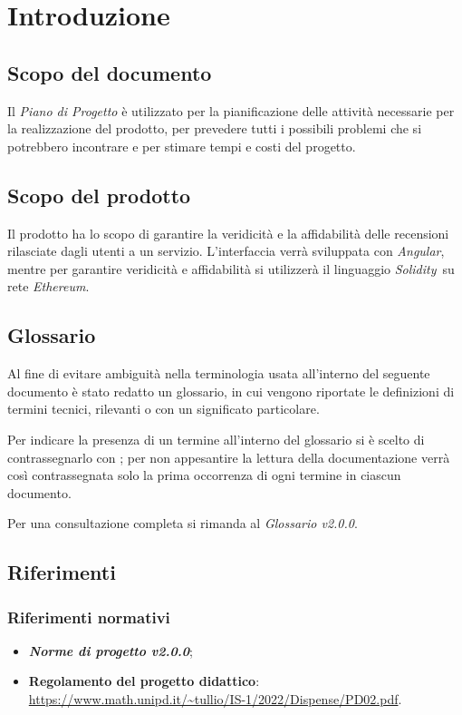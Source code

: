 \section{Introduzione}

\subsection{Scopo del documento}
Il \textit{Piano di Progetto} è utilizzato per la pianificazione delle attività necessarie per la realizzazione del prodotto, per prevedere tutti i possibili problemi che si potrebbero incontrare e per stimare tempi e costi del progetto.

\subsection{Scopo del prodotto}
Il prodotto ha lo scopo di garantire la veridicità e la affidabilità
delle recensioni rilasciate dagli utenti a un servizio. L'interfaccia verrà sviluppata con \textit{Angular}\glo, mentre per garantire veridicità e affidabilità si utilizzerà il linguaggio \textit{Solidity}\glo\ su rete \textit{Ethereum}\glo.

\subsection{Glossario}
Al fine di evitare ambiguità nella terminologia usata all'interno del seguente documento è stato redatto un glossario, in cui vengono riportate le definizioni di termini tecnici, rilevanti o con un significato particolare.

Per indicare la presenza di un termine all'interno del glossario si è scelto di contrassegnarlo con \glo; per non appesantire la lettura della documentazione verrà così contrassegnata solo la prima occorrenza di ogni termine in ciascun
documento.

Per una consultazione completa si rimanda al \textit{Glossario v2.0.0}.

\subsection{Riferimenti}
\subsubsection{Riferimenti normativi}
\begin{itemize}
    \item \textbf{\textit{Norme di progetto v2.0.0}};
    \item \textbf{Regolamento del progetto didattico}: \\
          \url{https://www.math.unipd.it/~tullio/IS-1/2022/Dispense/PD02.pdf}.
\end{itemize}
